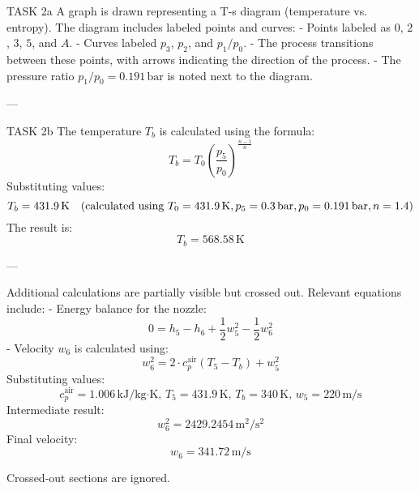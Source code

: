 TASK 2a  
A graph is drawn representing a T-s diagram (temperature vs. entropy). The diagram includes labeled points and curves:  
- Points labeled as \( 0 \), \( 2 \), \( 3 \), \( 5 \), and \( A \).  
- Curves labeled \( p_3 \), \( p_2 \), and \( p_1/p_0 \).  
- The process transitions between these points, with arrows indicating the direction of the process.  
- The pressure ratio \( p_1/p_0 = 0.191 \, \text{bar} \) is noted next to the diagram.

---

TASK 2b  
The temperature \( T_b \) is calculated using the formula:  
\[
T_b = T_0 \left( \frac{p_5}{p_0} \right)^{\frac{n-1}{n}}
\]  
Substituting values:  
\[
T_b = 431.9 \, \text{K} \quad \text{(calculated using \( T_0 = 431.9 \, \text{K}, p_5 = 0.3 \, \text{bar}, p_0 = 0.191 \, \text{bar}, n = 1.4 \))}
\]  
The result is:  
\[
T_b = 568.58 \, \text{K}
\]

---

Additional calculations are partially visible but crossed out. Relevant equations include:  
- Energy balance for the nozzle:  
\[
0 = h_5 - h_6 + \frac{1}{2} w_5^2 - \frac{1}{2} w_6^2
\]  
- Velocity \( w_6 \) is calculated using:  
\[
w_6^2 = 2 \cdot c_p^{\text{air}} (T_5 - T_b) + w_5^2
\]  
Substituting values:  
\[
c_p^{\text{air}} = 1.006 \, \text{kJ/kg·K}, \, T_5 = 431.9 \, \text{K}, \, T_b = 340 \, \text{K}, \, w_5 = 220 \, \text{m/s}
\]  
Intermediate result:  
\[
w_6^2 = 2429.2454 \, \text{m}^2/\text{s}^2
\]  
Final velocity:  
\[
w_6 = 341.72 \, \text{m/s}
\]  

Crossed-out sections are ignored.